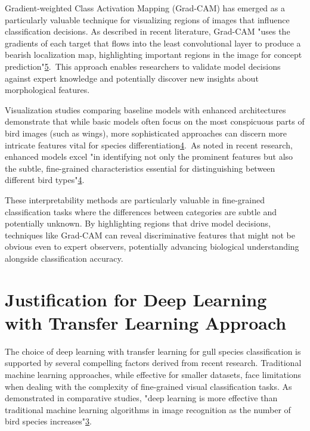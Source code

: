 \documentclass[a4paper,12pt]{article}
\begin{document}
Gradient-weighted Class Activation Mapping (Grad-CAM) has emerged as a particularly valuable technique for visualizing regions of images that influence classification decisions. As described in recent literature, Grad-CAM "uses the gradients of each target that flows into the least convolutional layer to produce a bearish localization map, highlighting important regions in the image for concept prediction"\href{https://www.atlantis-press.com/article/125986223.pdf}{5}. This approach enables researchers to validate model decisions against expert knowledge and potentially discover new insights about morphological features.

Visualization studies comparing baseline models with enhanced architectures demonstrate that while basic models often focus on the most conspicuous parts of bird images (such as wings), more sophisticated approaches can discern more intricate features vital for species differentiation\href{https://www.frontiersin.org/journals/neurorobotics/articles/10.3389/fnbot.2024.1391791/full}{4}. As noted in recent research, enhanced models excel "in identifying not only the prominent features but also the subtle, fine-grained characteristics essential for distinguishing between different bird types"\href{https://www.frontiersin.org/journals/neurorobotics/articles/10.3389/fnbot.2024.1391791/full}{4}.

These interpretability methods are particularly valuable in fine-grained classification tasks where the differences between categories are subtle and potentially unknown. By highlighting regions that drive model decisions, techniques like Grad-CAM can reveal discriminative features that might not be obvious even to expert observers, potentially advancing biological understanding alongside classification accuracy.

\section*{Justification for Deep Learning with Transfer Learning Approach}
The choice of deep learning with transfer learning for gull species classification is supported by several compelling factors derived from recent research. Traditional machine learning approaches, while effective for smaller datasets, face limitations when dealing with the complexity of fine-grained visual classification tasks. As demonstrated in comparative studies, "deep learning is more effective than traditional machine learning algorithms in image recognition as the number of bird species increases"\href{https://ijece.iaescore.com/index.php/IJECE/article/view/24833}{3}.
\end{document}
